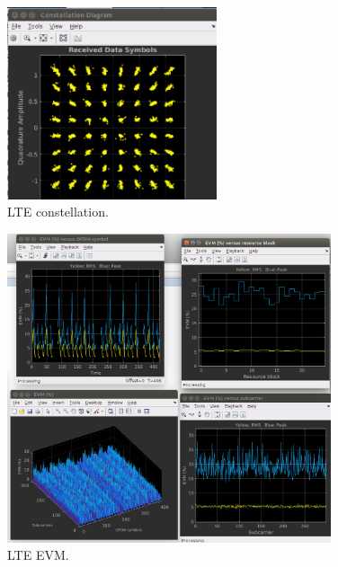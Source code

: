 \begin{figure}[htbp]
    \centering
    \includegraphics[width=0.55\textwidth]{./figures/lte_constellation_iio}
    \caption{ LTE constellation.
    \label{fig:lteconstellationiio}}
\end{figure}

\begin{figure}[htbp]
    \centering
    \includegraphics[width=0.85\textwidth]{./figures/lte_evm_iio}
    \caption{ LTE EVM.
    \label{fig:lteevmiio}}
\end{figure}

\vfill
\clearpage
